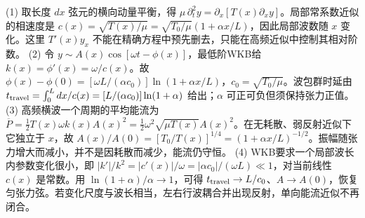 (1) 取长度 \(dx\) 弦元的横向动量平衡，得 \(\mu\,\partial_t^2 y=\partial_x[T(x)\partial_x y]\)。局部常系数近似的相速度是 \(c(x)=\sqrt{T(x)/\mu}=\sqrt{T_0/\mu}(1+\alpha x/L)\)，因此局部波数随 \(x\) 变化。这里 \(T'(x)y_x\) 不能在精确方程中预先删去，只能在高频近似中控制其相对阶数。
(2) 令 \(y\sim A(x)\cos[\omega t-\phi(x)]\)，最低阶WKB给 \(k(x)=\phi'(x)=\omega/c(x)\)。故 \(\phi(x)-\phi(0)=[\omega L/(\alpha c_0)]\ln(1+\alpha x/L)\)，\(c_0=\sqrt{T_0/\mu}\)。波包群时延由 \(t_{\rm travel}=\int_0^L dx/c(x)=[L/(\alpha c_0)]\ln(1+\alpha)\) 给出；\(\alpha\) 可正可负但须保持张力正值。
(3) 高频横波一个周期的平均能流为 \(\overline P=\frac12T(x)\omega k(x)A(x)^2=\frac12\omega^2\sqrt{\mu T(x)}A(x)^2\)。在无耗散、弱反射近似下它独立于 \(x\)，故 \(A(x)/A(0)=[T_0/T(x)]^{1/4}=(1+\alpha x/L)^{-1/2}\)。振幅随张力增大而减小，并不是因耗散而减少，能流仍守恒。
(4) WKB要求一个局部波长内参数变化很小，即 \(|k'|/k^2=|c'(x)|/\omega=|\alpha c_0|/(\omega L)\ll1\)，对当前线性 \(c(x)\) 是常数。用 \(\ln(1+\alpha)/\alpha\to1\)，可得 \(t_{\rm travel}\to L/c_0\)、\(A\to A(0)\)，恢复匀张力弦。若变化尺度与波长相当，左右行波耦合并出现反射，单向能流近似不再闭合。
